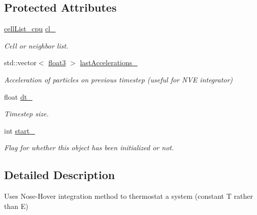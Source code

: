 \subsection*{Protected Attributes}
\begin{DoxyCompactItemize}
\item 
\hypertarget{classintegrator_ad1f7813c9cf3c31898aa7d78fc22232a}{\hyperlink{classcell_list__cpu}{cell\-List\-\_\-cpu} \hyperlink{classintegrator_ad1f7813c9cf3c31898aa7d78fc22232a}{cl\-\_\-}}\label{classintegrator_ad1f7813c9cf3c31898aa7d78fc22232a}

\begin{DoxyCompactList}\small\item\em Cell or neighbor list. \end{DoxyCompactList}\item 
\hypertarget{classintegrator_a3e183a65eb6a777479dca47e7f9a2676}{std\-::vector$<$ \hyperlink{structfloat3}{float3} $>$ \hyperlink{classintegrator_a3e183a65eb6a777479dca47e7f9a2676}{last\-Accelerations\-\_\-}}\label{classintegrator_a3e183a65eb6a777479dca47e7f9a2676}

\begin{DoxyCompactList}\small\item\em Acceleration of particles on previous timestep (useful for N\-V\-E integrator) \end{DoxyCompactList}\item 
\hypertarget{classintegrator_a6e4712b8597e3c40124316d2e9dd5051}{float \hyperlink{classintegrator_a6e4712b8597e3c40124316d2e9dd5051}{dt\-\_\-}}\label{classintegrator_a6e4712b8597e3c40124316d2e9dd5051}

\begin{DoxyCompactList}\small\item\em Timestep size. \end{DoxyCompactList}\item 
\hypertarget{classintegrator_a5b3546a765d8a83b6db8a6d890ace480}{int \hyperlink{classintegrator_a5b3546a765d8a83b6db8a6d890ace480}{start\-\_\-}}\label{classintegrator_a5b3546a765d8a83b6db8a6d890ace480}

\begin{DoxyCompactList}\small\item\em Flag for whether this object has been initialized or not. \end{DoxyCompactList}\end{DoxyCompactItemize}


\subsection{Detailed Description}
Uses Nose-\/\-Hover integration method to thermostat a system (constant T rather than E) 

